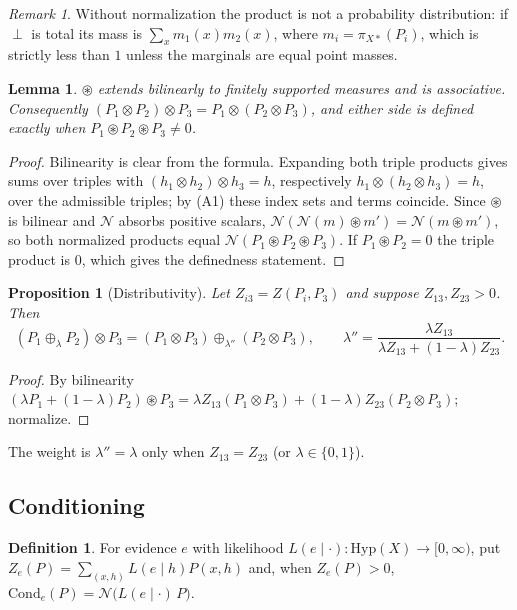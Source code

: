 \documentclass[11pt]{article}
\newtheorem{proposition}[theorem]{Proposition}
\newtheorem{lemma}[theorem]{Lemma}
\theoremstyle{definition}
\newtheorem{definition}[theorem]{Definition}
\theoremstyle{remark}
\newtheorem{remark}[theorem]{Remark}
\newcommand{\Hyp}{\mathrm{Hyp}}
\newcommand{\Cond}{\mathrm{Cond}}
\newcommand{\N}{\mathcal{N}}
\newcommand{\cp}{\circledast}
\begin{document}
\begin{remark}
Without normalization the product is not a probability distribution: if $\perp$ is total its mass
is $\sum_x m_1(x)m_2(x)$, where $m_i=\pi_{X*}(P_i)$, which is strictly less than $1$ unless the
marginals are equal point masses.
\end{remark}

\begin{lemma}\label{lem:assoc}
$\cp$ extends bilinearly to finitely supported measures and is associative. Consequently
$(P_1\otimes P_2)\otimes P_3=P_1\otimes(P_2\otimes P_3)$, and either side is defined exactly when
$P_1\cp P_2\cp P_3\neq 0$.
\end{lemma}
\begin{proof}
Bilinearity is clear from the formula. Expanding both triple products gives sums over triples with
$(h_1\otimes h_2)\otimes h_3=h$, respectively $h_1\otimes(h_2\otimes h_3)=h$, over the admissible
triples; by (A1) these index sets and terms coincide. Since $\cp$ is bilinear and $\N$ absorbs
positive scalars, $\N(\N(m)\cp m')=\N(m\cp m')$, so both normalized products equal
$\N(P_1\cp P_2\cp P_3)$. If $P_1\cp P_2=0$ the triple product is $0$, which gives the definedness
statement.
\end{proof}

\begin{proposition}[Distributivity]\label{prop:distrib}
Let $Z_{i3}=Z(P_i,P_3)$ and suppose $Z_{13},Z_{23}>0$. Then
\[
(P_1\oplus_\lambda P_2)\otimes P_3=(P_1\otimes P_3)\oplus_{\lambda''}(P_2\otimes P_3),\qquad
\lambda''=\frac{\lambda Z_{13}}{\lambda Z_{13}+(1-\lambda)Z_{23}} .
\]
\end{proposition}
\begin{proof}
By bilinearity $(\lambda P_1+(1-\lambda)P_2)\cp P_3=\lambda Z_{13}(P_1\otimes P_3)+(1-\lambda)Z_{23}
(P_2\otimes P_3)$; normalize.
\end{proof}

The weight is $\lambda''=\lambda$ only when $Z_{13}=Z_{23}$ (or $\lambda\in\{0,1\}$).

\subsection{Conditioning}

\begin{definition}
For evidence $e$ with likelihood $L(e\mid\cdot)\colon\Hyp(X)\to[0,\infty)$, put
$Z_e(P)=\sum_{(x,h)}L(e\mid h)P(x,h)$ and, when $Z_e(P)>0$,
$\Cond_e(P)=\N\big(L(e\mid\cdot)\,P\big)$.
\end{definition}
\end{document}
